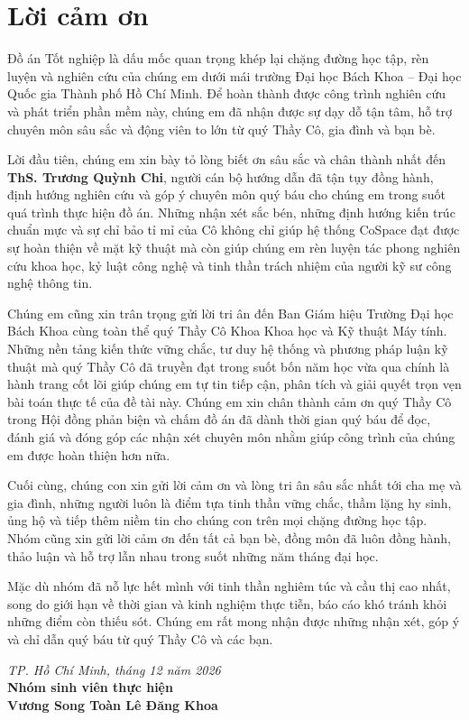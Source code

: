 \chapter*{Lời cảm ơn}

Đồ án Tốt nghiệp là dấu mốc quan trọng khép lại chặng đường học tập, rèn luyện và nghiên cứu của chúng em dưới mái trường Đại học Bách Khoa -- Đại học Quốc gia Thành phố Hồ Chí Minh. Để hoàn thành được công trình nghiên cứu và phát triển phần mềm này, chúng em đã nhận được sự dạy dỗ tận tâm, hỗ trợ chuyên môn sâu sắc và động viên to lớn từ quý Thầy Cô, gia đình và bạn bè.

Lời đầu tiên, chúng em xin bày tỏ lòng biết ơn sâu sắc và chân thành nhất đến \textbf{ThS. Trương Quỳnh Chi}, người cán bộ hướng dẫn đã tận tụy đồng hành, định hướng nghiên cứu và góp ý chuyên môn quý báu cho chúng em trong suốt quá trình thực hiện đồ án. Những nhận xét sắc bén, những định hướng kiến trúc chuẩn mực và sự chỉ bảo tỉ mỉ của Cô không chỉ giúp hệ thống CoSpace đạt được sự hoàn thiện về mặt kỹ thuật mà còn giúp chúng em rèn luyện tác phong nghiên cứu khoa học, kỷ luật công nghệ và tinh thần trách nhiệm của người kỹ sư công nghệ thông tin.

Chúng em cũng xin trân trọng gửi lời tri ân đến Ban Giám hiệu Trường Đại học Bách Khoa cùng toàn thể quý Thầy Cô Khoa Khoa học và Kỹ thuật Máy tính. Những nền tảng kiến thức vững chắc, tư duy hệ thống và phương pháp luận kỹ thuật mà quý Thầy Cô đã truyền đạt trong suốt bốn năm học vừa qua chính là hành trang cốt lõi giúp chúng em tự tin tiếp cận, phân tích và giải quyết trọn vẹn bài toán thực tế của đề tài này. Chúng em xin chân thành cảm ơn quý Thầy Cô trong Hội đồng phản biện và chấm đồ án đã dành thời gian quý báu để đọc, đánh giá và đóng góp các nhận xét chuyên môn nhằm giúp công trình của chúng em được hoàn thiện hơn nữa.

Cuối cùng, chúng con xin gửi lời cảm ơn và lòng tri ân sâu sắc nhất tới cha mẹ và gia đình, những người luôn là điểm tựa tinh thần vững chắc, thầm lặng hy sinh, ủng hộ và tiếp thêm niềm tin cho chúng con trên mọi chặng đường học tập. Nhóm cũng xin gửi lời cảm ơn đến tất cả bạn bè, đồng môn đã luôn đồng hành, thảo luận và hỗ trợ lẫn nhau trong suốt những năm tháng đại học.

Mặc dù nhóm đã nỗ lực hết mình với tinh thần nghiêm túc và cầu thị cao nhất, song do giới hạn về thời gian và kinh nghiệm thực tiễn, báo cáo khó tránh khỏi những điểm còn thiếu sót. Chúng em rất mong nhận được những nhận xét, góp ý và chỉ dẫn quý báu từ quý Thầy Cô và các bạn.

\vspace{1.5cm}
\begin{flushright}
\textit{TP. Hồ Chí Minh, tháng 12 năm 2026}\\[0.4cm]
\textbf{Nhóm sinh viên thực hiện}\\[1.5cm]
\textbf{Vương Song Toàn \hspace{1.5cm} Lê Đăng Khoa}
\end{flushright}
